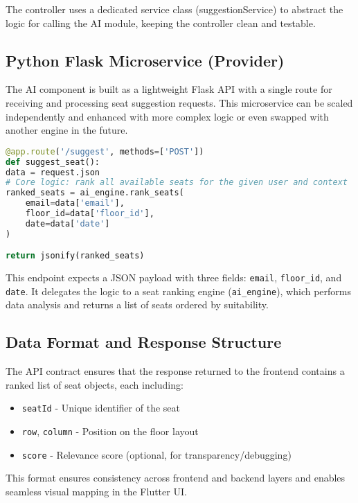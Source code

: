 \documentclass[12pt,a4paper]{report}
\begin{document}
The controller uses a dedicated service class (suggestionService) to abstract the logic for calling the AI module, keeping the controller clean and testable.

\subsection*{Python Flask Microservice (Provider)}

The AI component is built as a lightweight Flask API with a single route for receiving and processing seat suggestion requests. This microservice can be scaled independently and enhanced with more complex logic or even swapped with another engine in the future.

\begin{lstlisting}[language=Python, caption=Python Flask Endpoint]
@app.route('/suggest', methods=['POST'])
def suggest_seat():
data = request.json
# Core logic: rank all available seats for the given user and context
ranked_seats = ai_engine.rank_seats(
    email=data['email'],
    floor_id=data['floor_id'],
    date=data['date']
)

return jsonify(ranked_seats)
\end{lstlisting}

This endpoint expects a JSON payload with three fields: \texttt{email}, \texttt{floor\_id}, and \texttt{date}. It delegates the logic to a seat ranking engine (\texttt{ai\_engine}), which performs data analysis and returns a list of seats ordered by suitability.

\subsection*{Data Format and Response Structure}

The API contract ensures that the response returned to the frontend contains a ranked list of seat objects, each including:

\begin{itemize}
\item \texttt{seatId} - Unique identifier of the seat
\item \texttt{row}, \texttt{column} - Position on the floor layout
\item \texttt{score} - Relevance score (optional, for transparency/debugging)
\end{itemize}

This format ensures consistency across frontend and backend layers and enables seamless visual mapping in the Flutter UI.
\end{document}
